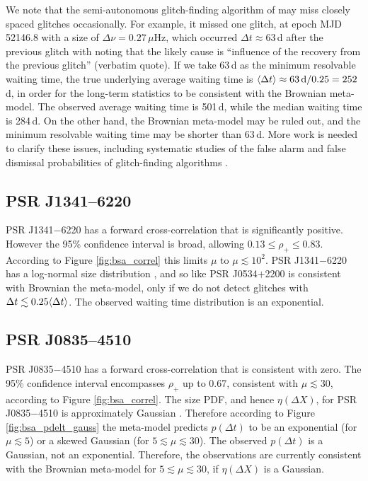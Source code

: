 We note that the semi-autonomous glitch-finding algorithm of \citet{Espinoza2014} may miss closely spaced glitches occasionally. For example, it missed one glitch, at epoch MJD 52146.8 with a size of $\Delta \nu=0.27\,\mu$Hz, which occurred $\Delta t \approx 63\,$d after the previous glitch with \citet{Espinoza2014} noting that the likely cause is ``influence of the recovery from the previous glitch'' (verbatim quote). If we take 63$\,$d as the minimum resolvable waiting time, the true underlying average waiting time is $\langle \Delta t \rangle \approx 63\,\textrm{d} / 0.25 = 252\,$d, in order for the long-term statistics to be consistent with the Brownian meta-model. The observed average waiting time is 501$\,$d, while the median waiting time is 284$\,$d. On the other hand, the Brownian meta-model may be ruled out, and the minimum resolvable waiting time may be shorter than $63\,$d. More work is needed to clarify these issues, including systematic studies of the false alarm and false dismissal probabilities of glitch-finding algorithms \citep{Janssen2006, Shannon2016, Yu2017b, Lower2020}.

\subsection{PSR J1341--6220}
PSR J1341$-$6220 has a forward cross-correlation that is significantly positive. However the 95\% confidence interval is broad, allowing $0.13 \leq \rho_+ \leq 0.83$. According to Figure \ref{fig:bsa_correl} this limits $\mu$ to $\mu \lesssim 10^2$. PSR J1341$-$6220 has a log-normal size distribution \citep{Fuentes2019}, and so like PSR J0534$+$2200 is consistent with Brownian the meta-model, only if we do not detect glitches with $\Delta t \lesssim 0.25\langle \Delta t \rangle$. The observed waiting time distribution is an exponential.

\subsection{PSR J0835--4510}
PSR J0835$-$4510 has a forward cross-correlation that is consistent with zero. The 95\% confidence interval encompasses $\rho_+$ up to 0.67, consistent with $\mu \lesssim 30$, according to Figure \ref{fig:bsa_correl}. The size PDF, and hence $\eta(\Delta X)$, for PSR J0835$-$4510 is approximately Gaussian \citep{Fuentes2019}. Therefore according to Figure \ref{fig:bsa_pdelt_gauss} the meta-model predicts $p(\Delta t)$ to be an exponential (for $\mu \lesssim 5$) or a skewed Gaussian (for $5 \lesssim \mu \lesssim 30$). The observed $p(\Delta t)$ is a Gaussian, not an exponential. Therefore, the observations are currently consistent with the Brownian meta-model for $5 \lesssim \mu \lesssim 30$, if $\eta(\Delta X)$ is a Gaussian. 

